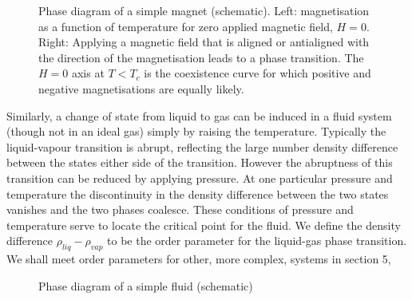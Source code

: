 \documentclass[
  letterpaper,
  DIV=11,
  numbers=noendperiod]{scrreprt}
\begin{document}
\begin{figure}


\caption{\label{fig-isingpd}Phase diagram of a simple magnet
(schematic). Left: magnetisation as a function of temperature for zero
applied magnetic field, \(H=0\). Right: Applying a magnetic field that
is aligned or antialigned with the direction of the magnetisation leads
to a phase transition. The \(H=0\) axis at \(T<T_c\) is the coexistence
curve for which positive and negative magnetisations are equally
likely.}

\end{figure}%

Similarly, a change of state from liquid to gas can be induced in a
fluid system (though not in an ideal gas) simply by raising the
temperature. Typically the liquid-vapour transition is abrupt,
reflecting the large number density difference between the states either
side of the transition. However the abruptness of this transition can be
reduced by applying pressure. At one particular pressure and temperature
the discontinuity in the density difference between the two states
vanishes and the two phases coalesce. These conditions of pressure and
temperature serve to locate the critical point for the fluid. We define
the density difference \(\rho_{liq}-\rho_{vap}\) to be the order
parameter for the liquid-gas phase transition. We shall meet order
parameters for other, more complex, systems in section 5,

\begin{figure}


\caption{\label{fig-fluidpd}Phase diagram of a simple fluid (schematic)}

\end{figure}%
\end{document}
